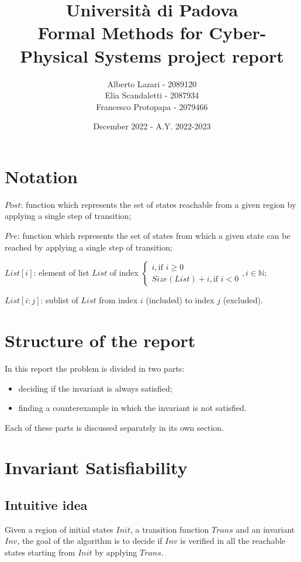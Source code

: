 \documentclass[12pt]{article}
\title{\textbf{Università di Padova \\ Formal Methods for Cyber-Physical Systems project report}}
\author{Alberto Lazari - 2089120 \\ Elia Scandaletti - 2087934 \\ Francesco Protopapa - 2079466 \\}
\date{December 2022 - A.Y. 2022-2023}
\begin{document}
    \maketitle
    \pagebreak

    \tableofcontents
    \pagebreak

    \section{Notation}
    \begin{description}
        \item $Post$: function which represents the set of states reachable from a given region by applying a single step of transition;
        \item $Pre$: function which represents the set of states from which a given state can be reached by applying a single step of transition;
        \item $List[i]$: element of list $List$ of index $
        \begin{cases}
            i, \mbox{if } i \geq 0 \\
             Size(List) + i, \mbox{if } i < 0
        \end{cases}, i \in \mathbb N$;
        \item $List[i:j]$: sublist of $List$ from index $i$ (included) to index $j$ (excluded). 
    \end{description}

    \section{Structure of the report}
    In this report the problem is divided in two parts:
    \begin{itemize}
        \item deciding if the invariant is always satisfied;
        \item finding a counterexample in which the invariant is not satisfied.
    \end{itemize}
    Each of these parts is discussed separately in its own section.

    \section{Invariant Satisfiability}
    \subsection{Intuitive idea}
    Given a region of initial states $Init$, a transition function $Trans$ and an invariant $Inv$, the goal of the algorithm is to decide if $Inv$ is verified in all the reachable states starting from $Init$ by applying $Trans$.
\end{document}

